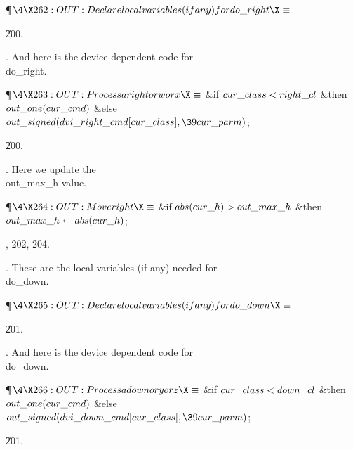 \Y\P$\4\X262:OUT: Declare local variables (if any) for \\{do\_right}\X\S$\par
\U200.\fi

. And here is the device dependent code for \\{do\_right}.

\Y\P$\4\X263:OUT: Process a \\{right} or \|w or \|x\X\S$\6
\&{if} $\\{cur\_class}<\\{right\_cl}$ \1\&{then}\5
$\\{out\_one}(\\{cur\_cmd})$\6
\4\&{else} $\\{out\_signed}(\\{dvi\_right\_cmd}[\\{cur\_class}],\39\\{cur%
\_parm})$;\2\par
\U200.\fi

. Here we update the \\{out\_max\_h} value.

\Y\P$\4\X264:OUT: Move right\X\S$\6
\&{if} $\\{abs}(\\{cur\_h})>\\{out\_max\_h}$ \1\&{then}\5
$\\{out\_max\_h}\gets\\{abs}(\\{cur\_h})$;\2\par
{}, 202, 204.\fi

. These are the local variables (if any) needed for \\{do\_down}.

\Y\P$\4\X265:OUT: Declare local variables (if any) for \\{do\_down}\X\S$\par
\U201.\fi

. And here is the device dependent code for \\{do\_down}.

\Y\P$\4\X266:OUT: Process a \\{down} or \|y or \|z\X\S$\6
\&{if} $\\{cur\_class}<\\{down\_cl}$ \1\&{then}\5
$\\{out\_one}(\\{cur\_cmd})$\6
\4\&{else} $\\{out\_signed}(\\{dvi\_down\_cmd}[\\{cur\_class}],\39\\{cur%
\_parm})$;\2\par
\U201.\fi

